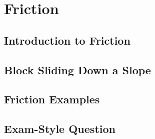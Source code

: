 \documentclass[../maths.tex]{subfiles}
\begin{document}
\chapter{Friction}
\section{Introduction to Friction}
\section{Block Sliding Down a Slope}
\section{Friction Examples}
\section{Exam-Style Question}
\end{document}
